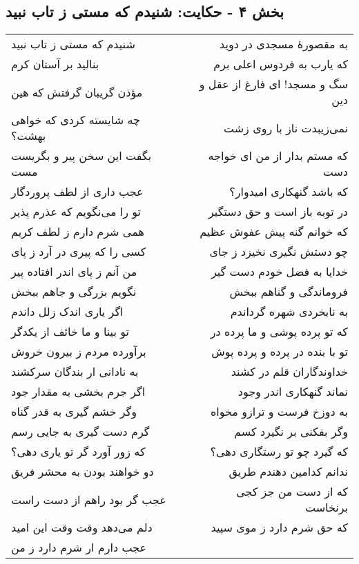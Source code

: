 \begin{center}
\section*{بخش ۴ - حکایت: شنیدم که مستی ز تاب نبید}
\label{sec:004}
\begin{longtable}{l p{0.5cm} r}
شنیدم که مستی ز تاب نبید
&&
به مقصورهٔ مسجدی در دوید
\\
بنالید بر آستان کرم
&&
که یارب به فردوس اعلی برم
\\
مؤذن گریبان گرفتش که هین
&&
سگ و مسجد! ای فارغ از عقل و دین
\\
چه شایسته کردی که خواهی بهشت؟
&&
نمی‌زیبدت ناز با روی زشت
\\
بگفت این سخن پیر و بگریست مست
&&
که مستم بدار از من ای خواجه دست
\\
عجب داری از لطف پروردگار
&&
که باشد گنهکاری امیدوار؟
\\
تو را می‌نگویم که عذرم پذیر
&&
در توبه باز است و حق دستگیر
\\
همی شرم دارم ز لطف کریم
&&
که خوانم گنه پیش عفوش عظیم
\\
کسی را که پیری در آرد ز پای
&&
چو دستش نگیری نخیزد ز جای
\\
من آنم ز پای اندر افتاده پیر
&&
خدایا به فضل خودم دست گیر
\\
نگویم بزرگی و جاهم ببخش
&&
فروماندگی و گناهم ببخش
\\
اگر یاری اندک زلل داندم
&&
به نابخردی شهره گرداندم
\\
تو بینا و ما خائف از یکدگر
&&
که تو پرده پوشی و ما پرده در
\\
برآورده مردم ز بیرون خروش
&&
تو با بنده در پرده و پرده پوش
\\
به نادانی ار بندگان سرکشند
&&
خداوندگاران قلم در کشند
\\
اگر جرم بخشی به مقدار جود
&&
نماند گنهکاری اندر وجود
\\
وگر خشم گیری به قدر گناه
&&
به دوزخ فرست و ترازو مخواه
\\
گرم دست گیری به جایی رسم
&&
وگر بفکنی بر نگیرد کسم
\\
که زور آورد گر تو یاری دهی؟
&&
که گیرد چو تو رستگاری دهی؟
\\
دو خواهند بودن به محشر فریق
&&
ندانم کدامین دهندم طریق
\\
عجب گر بود راهم از دست راست
&&
که از دست من جز کجی برنخاست
\\
دلم می‌دهد وقت وقت این امید
&&
که حق شرم دارد ز موی سپید
\\
عجب دارم ار شرم دارد ز من

\end{longtable}
\end{center}
